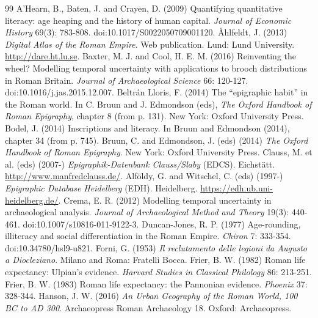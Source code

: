 \documentclass[11pt,a4paper]{article}
\begin{document}
\begin{thebibliography}{99}
 A'Hearn, B., Baten, J. and Crayen, D. (2009) Quantifying quantitative literacy: age heaping and the history of human capital. \textit{Journal of Economic History} 69(3): 783-808. doi:10.1017/S0022050709001120.
 {\AA}hlfeldt, J. (2013) \textit{Digital Atlas of the Roman Empire}. Web publication. Lund: Lund University. \url{http://dare.ht.lu.se}.
 Baxter, M. J. and Cool, H. E. M. (2016) Reinventing the wheel? Modelling temporal uncertainty with applications to brooch distributions in Roman Britain. \textit{Journal of Archaeological Science} 66: 120-127. doi:10.1016/j.jas.2015.12.007.
 Beltr{\'a}n Lloris, F. (2014) The ``epigraphic habit'' in the Roman world. In C. Bruun and J. Edmondson (eds), \textit{The Oxford Handbook of Roman Epigraphy}, chapter 8 (from p. 131). New York: Oxford University Press.
 Bodel, J. (2014) Inscriptions and literacy. In Bruun and Edmondson (2014), chapter 34 (from p. 745).
 Bruun, C. and Edmondson, J. (eds) (2014) \textit{The Oxford Handbook of Roman Epigraphy}. New York: Oxford University Press.
 Clauss, M. et al. (eds) (2007-) \textit{Epigraphik-Datenbank Clauss/Slaby} (EDCS). Eichst{\"a}tt. \url{http://www.manfredclauss.de/}.
 Alf{\"o}ldy, G. and Witschel, C. (eds) (1997-) \textit{Epigraphic Database Heidelberg} (EDH). Heidelberg. \url{https://edh.ub.uni-heidelberg.de/}.
 Crema, E. R. (2012) Modelling temporal uncertainty in archaeological analysis. \textit{Journal of Archaeological Method and Theory} 19(3): 440-461. doi:10.1007/s10816-011-9122-3.
 Duncan-Jones, R. P. (1977) Age-rounding, illiteracy and social differentiation in the Roman Empire. \textit{Chiron} 7: 333-354. doi:10.34780/hsl9-u821.
 Forni, G. (1953) \textit{Il reclutamento delle legioni da Augusto a Diocleziano}. Milano and Roma: Fratelli Bocca.
 Frier, B. W. (1982) Roman life expectancy: Ulpian's evidence. \textit{Harvard Studies in Classical Philology} 86: 213-251.
 Frier, B. W. (1983) Roman life expectancy: the Pannonian evidence. \textit{Phoenix} 37: 328-344.
 Hanson, J. W. (2016) \textit{An Urban Geography of the Roman World, 100 BC to AD 300}. Archaeopress Roman Archaeology 18. Oxford: Archaeopress.

\end{thebibliography}
\end{document}
